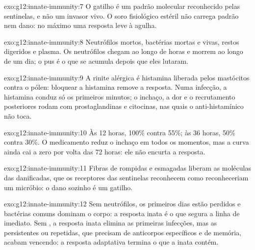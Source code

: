 \begin{solution}{exo:g12:innate-immunity:7}
O gatilho é um padrão molecular reconhecido pelas  sentinelas, e
não um invasor vivo. O soro fisiológico estéril não carrega padrão nem
dano: no máximo uma resposta leve à agulha.
\end{solution}

\begin{solution}{exo:g12:innate-immunity:8}
Neutrófilos mortos, bactérias mortas e vivas, restos digeridos e
plasma. Os neutrófilos chegam ao longo de horas e morrem ao longo de um
dia; o pus é o que se acumula depois que eles lutaram.
\end{solution}

\begin{solution}{exo:g12:innate-immunity:9}
A rinite alérgica é histamina liberada pelos mastócitos contra o pólen:
bloquear a histamina remove a resposta. Numa infecção, a histamina
conduz só os primeiros minutos; o inchaço, a dor e o recrutamento
posteriores rodam com prostaglandinas e citocinas, nas quais o
anti-histamínico não toca.
\end{solution}

\begin{solution}{exo:g12:innate-immunity:10}
Às 12 horas, 100\% contra 55\%; às 36 horas, 50\% contra 30\%. O
medicamento reduz o inchaço em todos os momentos, mas a curva ainda cai
a zero por volta das 72 horas: ele não encurta a resposta.
\end{solution}

\begin{solution}{exo:g12:innate-immunity:11}
Fibras de  rompidas e  esmagadas liberam as moléculas
das  danificadas, que os receptores das  sentinelas
reconhecem como reconheceriam um micróbio: o dano sozinho é um gatilho.
\end{solution}

\begin{solution}{exo:g12:innate-immunity:12}
Sem neutrófilos, os primeiros dias estão perdidos e bactérias comuns
dominam o corpo: a resposta inata é o que segura a linha de imediato.
Sem , a resposta inata elimina as primeiras
infecções, mas as persistentes ou repetidas, que precisam de anticorpos
específicos e de memória, acabam vencendo: a resposta adaptativa
termina o que a inata contém.
\end{solution}

